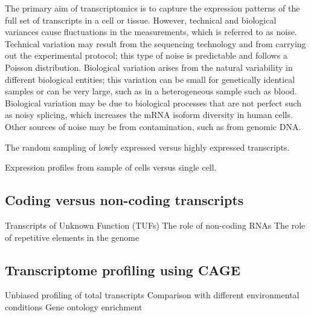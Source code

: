 The primary aim of transcriptomics is to capture the expression patterns of the full set of transcripts in a cell or tissue. However, technical and biological variances cause fluctuations in the measurements, which is referred to as noise. Technical variation may result from the sequencing technology and from carrying out the experimental protocol; this type of noise is predictable and follows a Poisson distribution. Biological variation arises from the natural variability in different biological entities; this variation can be small for genetically identical samples or can be very large, such as in a heterogeneous sample such as blood. Biological variation may be due to biological processes that are not perfect such as noisy splicing, which increases the mRNA isoform diversity in human cells\cite{pmid21151575}. Other sources of noise may be from contamination, such as from genomic DNA.

The random sampling of lowly expressed versus highly expressed transcripts.

Expression profiles from sample of cells versus single cell.

\subsection{Coding versus non-coding transcripts}

Transcripts of Unknown Function (TUFs)
The role of non-coding RNAs
The role of repetitive elements in the genome

\subsection{Transcriptome profiling using CAGE}

Unbiased profiling of total transcripts
Comparison with different environmental conditions
Gene ontology enrichment
